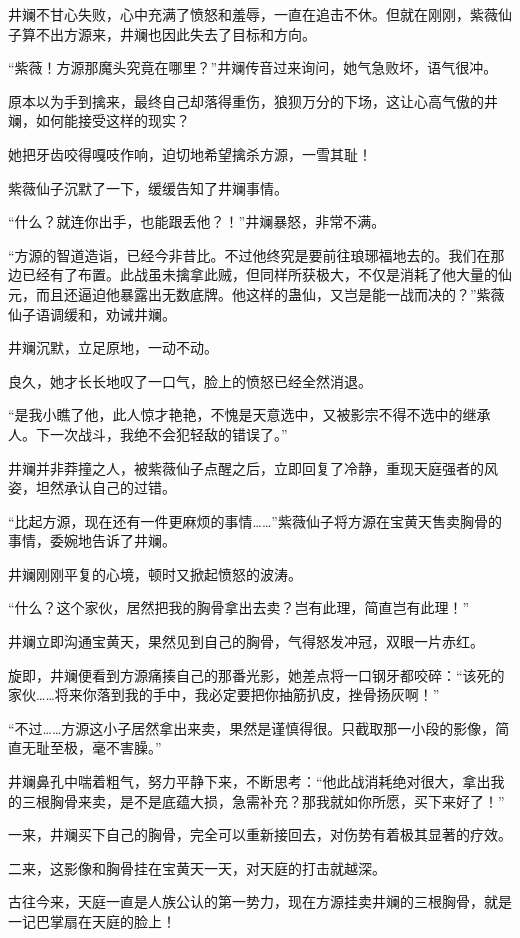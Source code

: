 \begin{this_body}
井斓不甘心失败，心中充满了愤怒和羞辱，一直在追击不休。但就在刚刚，紫薇仙子算不出方源来，井斓也因此失去了目标和方向。

“紫薇！方源那魔头究竟在哪里？”井斓传音过来询问，她气急败坏，语气很冲。

原本以为手到擒来，最终自己却落得重伤，狼狈万分的下场，这让心高气傲的井斓，如何能接受这样的现实？

她把牙齿咬得嘎吱作响，迫切地希望擒杀方源，一雪其耻！

紫薇仙子沉默了一下，缓缓告知了井斓事情。

“什么？就连你出手，也能跟丢他？！”井斓暴怒，非常不满。

“方源的智道造诣，已经今非昔比。不过他终究是要前往琅琊福地去的。我们在那边已经有了布置。此战虽未擒拿此贼，但同样所获极大，不仅是消耗了他大量的仙元，而且还逼迫他暴露出无数底牌。他这样的蛊仙，又岂是能一战而决的？”紫薇仙子语调缓和，劝诫井斓。

井斓沉默，立足原地，一动不动。

良久，她才长长地叹了一口气，脸上的愤怒已经全然消退。

“是我小瞧了他，此人惊才艳艳，不愧是天意选中，又被影宗不得不选中的继承人。下一次战斗，我绝不会犯轻敌的错误了。”

井斓并非莽撞之人，被紫薇仙子点醒之后，立即回复了冷静，重现天庭强者的风姿，坦然承认自己的过错。

“比起方源，现在还有一件更麻烦的事情……”紫薇仙子将方源在宝黄天售卖胸骨的事情，委婉地告诉了井斓。

井斓刚刚平复的心境，顿时又掀起愤怒的波涛。

“什么？这个家伙，居然把我的胸骨拿出去卖？岂有此理，简直岂有此理！”

井斓立即沟通宝黄天，果然见到自己的胸骨，气得怒发冲冠，双眼一片赤红。

旋即，井斓便看到方源痛揍自己的那番光影，她差点将一口钢牙都咬碎：“该死的家伙……将来你落到我的手中，我必定要把你抽筋扒皮，挫骨扬灰啊！”

“不过……方源这小子居然拿出来卖，果然是谨慎得很。只截取那一小段的影像，简直无耻至极，毫不害臊。”

井斓鼻孔中喘着粗气，努力平静下来，不断思考：“他此战消耗绝对很大，拿出我的三根胸骨来卖，是不是底蕴大损，急需补充？那我就如你所愿，买下来好了！”

一来，井斓买下自己的胸骨，完全可以重新接回去，对伤势有着极其显著的疗效。

二来，这影像和胸骨挂在宝黄天一天，对天庭的打击就越深。

古往今来，天庭一直是人族公认的第一势力，现在方源挂卖井斓的三根胸骨，就是一记巴掌扇在天庭的脸上！


\end{this_body}
